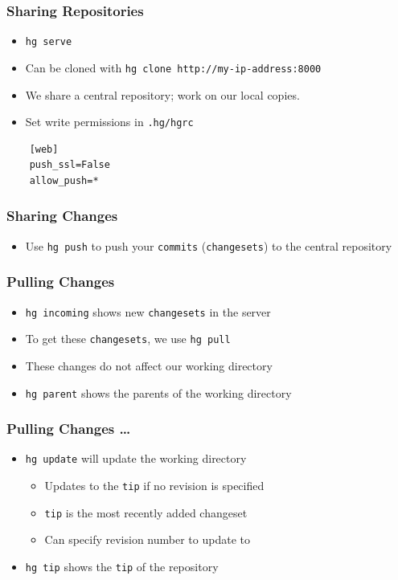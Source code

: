 \documentclass[12pt,compress]{beamer}
\newcommand{\typ}[1]{\lstinline{#1}}
\begin{document}
\begin{frame}[fragile]
  \frametitle{Sharing Repositories}
\label{sec-4}

  \begin{itemize}
  \item \typ{hg serve}
  \item Can be cloned with \typ{hg clone http://my-ip-address:8000}
  \item We share a central repository; work on our local copies. 
  \item Set write permissions in \typ{.hg/hgrc}
  \end{itemize}
  \begin{lstlisting}
    [web]
    push_ssl=False
    allow_push=*
  \end{lstlisting}
\end{frame}

\begin{frame}
  \frametitle{Sharing Changes}
\label{sec-5}

  \begin{itemize}
  \item Use \typ{hg push} to push your \typ{commits}
    (\typ{changesets}) to the central repository
  \end{itemize}
\end{frame}


\begin{frame}
  \frametitle{Pulling Changes}
\label{sec-6}

  \begin{itemize}
  \item \typ{hg incoming} shows new \typ{changesets} in the server 
  \item To get these \typ{changesets}, we use \typ{hg pull}
  \item These changes do not affect our working directory
  \item \typ{hg parent} shows the parents of the working directory
  \end{itemize}
\end{frame}

\begin{frame}
  \frametitle{Pulling Changes \ldots}
\label{sec-7}

  \begin{itemize}
  \item \typ{hg update} will update the working directory 
    \begin{itemize}
    \item Updates to the \typ{tip} if no revision is specified
    \item \typ{tip} is the most recently added changeset 
    \item Can specify revision number to update to
    \end{itemize}
  \item \typ{hg tip} shows the \typ{tip} of the repository
  \end{itemize}
\end{frame}
\end{document}
